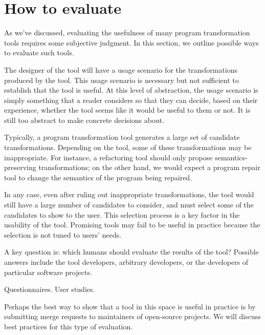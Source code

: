 \section{How to evaluate}
As we've discussed, evaluating the usefulness of many program
transformation tools requires some subjective judgment. In this
section, we outline possible ways to evaluate such tools.

The designer of the tool will have a usage scenario for the 
transformations produced by the tool. This usage scenario is 
necessary but not sufficient to establish that the tool is useful.
At this level of abstraction, the usage scenario is simply something
that a reader considers so that they can decide, based on their experience, 
whether the tool seems like it would be useful to them or not. 
It is still too abstract to make concrete decisions about.

Typically, a program transformation tool generates a large set of
candidate transformations. Depending on the tool, some of these
transformations may be inappropriate. For instance, a refactoring
tool should only propose semantics-preserving transformations; on the
other hand, we would expect a program repair tool to change the semantics
of the program being repaired. 

In any case, even after ruling out 
inappropriate transformations, the tool would still have a large
number of candidates to consider, and must select some of the candidates to show
to the user. This selection process is a key factor in the usability of the tool.
Promising tools may fail to be useful in practice because the selection is not
tuned to users' needs.



A key question is: which humans should evaluate the results of the tool?
Possible answers include the tool developers, arbitrary developers, or the developers
of particular software projects.

Questionnaires. User studies.

Perhaps the best way to show that a tool in this space is useful in
practice is by submitting merge requests to maintainers of open-source
projects. We will discuss best practices for this type of evaluation.
